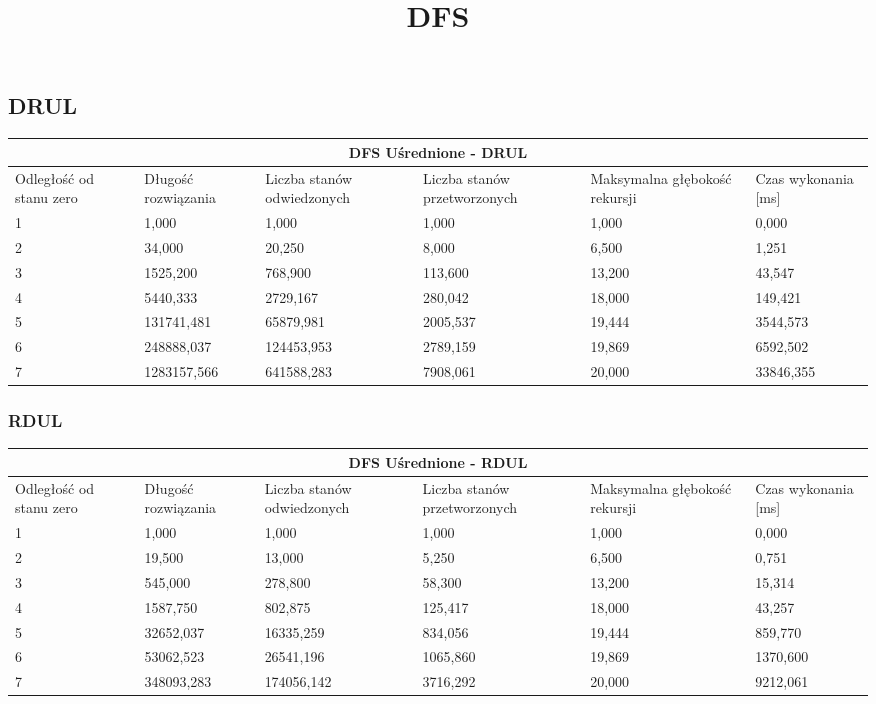 \documentclass{classrep}
\begin{document}
{\begin{center}
	\title{\textbf{DFS}}
\end{center}

\subsection{DRUL}
\begin{center}
	\begin{tabular}{ | p{1.6cm} | p{2cm} | p{2cm} | p{2cm} | p{2.2cm} | p{2cm} | }
	\hline
	\multicolumn{6}{|c|}{DFS Uśrednione - DRUL} \\
	\hline
	Odległość od stanu zero & Długość rozwiązania & Liczba stanów odwiedzonych & Liczba stanów przetworzonych & Maksymalna głębokość rekursji & Czas wykonania [ms]\\
	\hline
	1 &1,000&1,000&1,000&1,000&0,000 \\
	\hline
	2 &34,000&20,250&8,000&6,500&1,251 \\
	\hline
	3 &1525,200&768,900&113,600&13,200&43,547 \\
	\hline
	4 &5440,333&2729,167&280,042&18,000&149,421 \\
	\hline
	5 &131741,481&65879,981&2005,537&19,444&3544,573 \\
	\hline
	6 &248888,037&124453,953&2789,159&19,869&6592,502 \\
	\hline
	7&1283157,566&641588,283&7908,061&20,000&33846,355 \\
	\hline
	\end{tabular}
\end{center}

\subsubsection{RDUL}
\begin{center}
	\begin{tabular}{ | p{1.6cm} | p{2cm} | p{2cm} | p{2cm} | p{2.2cm} | p{2cm} | }
	\hline
	\multicolumn{6}{|c|}{DFS Uśrednione - RDUL} \\
	\hline
	Odległość od stanu zero & Długość rozwiązania & Liczba stanów odwiedzonych & Liczba stanów przetworzonych & Maksymalna głębokość rekursji & Czas wykonania [ms]\\
	\hline
	1 &1,000&1,000&1,000&1,000&0,000\\
	\hline
	2 &19,500&13,000&5,250	&6,500&0,751\\
	\hline
	3 &545,000&278,800&58,300&13,200&15,314\\
	\hline
	4 &1587,750&802,875&125,417&18,000&43,257\\
	\hline
	5 &32652,037&16335,259&834,056&19,444&859,770\\
	\hline
	6 &53062,523&26541,196&1065,860&19,869&1370,600\\
	\hline
	7 &348093,283&174056,142&3716,292&20,000&9212,061 \\
	\hline
	\end{tabular}
\end{center}

}
\end{document}

